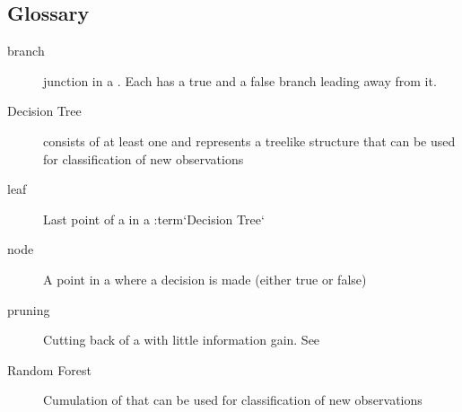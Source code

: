 \documentclass[letterpaper,10pt,english]{sphinxmanual}
\begin{document}
\subsection{Glossary}
\label{\detokenize{Overview:glossary}}\begin{description}
\item[{branch}] \leavevmode{}\label{\detokenize{Overview:term-branch}}
junction in a {\hyperref[\detokenize{Overview:term-decision-tree}]{}}. Each {\hyperref[\detokenize{Overview:term-node}]{}} has a true and a false branch leading away from it.

\item[{Decision Tree}] \leavevmode{}\label{\detokenize{Overview:term-decision-tree}}
consists of at least one {\hyperref[\detokenize{Overview:term-node}]{}} and represents a treelike structure that can be used for classification of new observations

\item[{leaf}] \leavevmode{}\label{\detokenize{Overview:term-leaf}}
Last point of a {\hyperref[\detokenize{Overview:term-branch}]{}} in a :term{}`Decision Tree{}`

\item[{node}] \leavevmode{}\label{\detokenize{Overview:term-node}}
A point in a {\hyperref[\detokenize{Overview:term-decision-tree}]{}} where a decision is made (either true or false)

\item[{pruning}] \leavevmode{}\label{\detokenize{Overview:term-pruning}}
Cutting back {\hyperref[\detokenize{Overview:term-branch}]{}} of a {\hyperref[\detokenize{Overview:term-decision-tree}]{}} with little information gain.
See {\hyperref[\detokenize{DT:prune}]{}}

\item[{Random Forest}] \leavevmode{}\label{\detokenize{Overview:term-random-forest}}
Cumulation of {\hyperref[\detokenize{Overview:term-decision-tree}]{}} that can be used for classification of new observations

\end{description}
\end{document}
